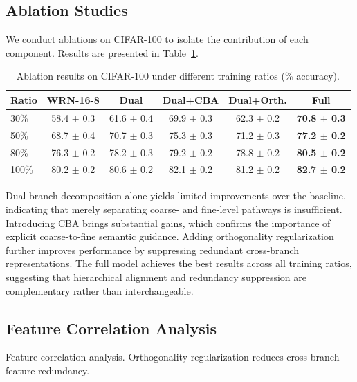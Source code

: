 \documentclass[pdflatex,sn-mathphys-num]{sn-jnl}
\theoremstyle{thmstyleone}%
\theoremstyle{thmstyletwo}%
\theoremstyle{thmstylethree}%
\begin{document}
\subsection{Ablation Studies}
We conduct ablations on CIFAR-100 to isolate the contribution of each component. Results are presented in Table~\ref{tab:ablation_all}.

\begin{table}[htbp]
    \centering
    \caption{Ablation results on CIFAR-100 under different training ratios (\% accuracy).}
    \label{tab:ablation_all}
    \setlength{\tabcolsep}{4pt}
    \renewcommand{\arraystretch}{1.1}
    \small
    \begin{tabular}{@{}lccccc@{}}
    \toprule
    \textbf{Ratio} & \textbf{WRN-16-8} & \textbf{Dual} & \textbf{Dual+CBA} & \textbf{Dual+Orth.} & \textbf{Full} \\
    \midrule
    30\%  & 58.4 $\pm$ 0.3 & 61.6 $\pm$ 0.4 & 69.9 $\pm$ 0.3 & 62.3 $\pm$ 0.2 & \textbf{70.8 $\pm$ 0.3} \\
    50\%  & 68.7 $\pm$ 0.4 & 70.7 $\pm$ 0.3 & 75.3 $\pm$ 0.3 & 71.2 $\pm$ 0.3 & \textbf{77.2 $\pm$ 0.2} \\
    80\%  & 76.3 $\pm$ 0.2 & 78.2 $\pm$ 0.3 & 79.2 $\pm$ 0.2 & 78.8 $\pm$ 0.2 & \textbf{80.5 $\pm$ 0.2} \\
    100\% & 80.2 $\pm$ 0.2 & 80.6 $\pm$ 0.2 & 82.1 $\pm$ 0.2 & 81.2 $\pm$ 0.2 & \textbf{82.7 $\pm$ 0.2} \\
    \bottomrule
    \end{tabular}
\end{table}

Dual-branch decomposition alone yields limited improvements over the baseline, indicating that merely separating coarse- and fine-level pathways is insufficient. 
Introducing CBA brings substantial gains, which confirms the importance of explicit coarse-to-fine semantic guidance. 
Adding orthogonality regularization further improves performance by suppressing redundant cross-branch representations. 
The full model achieves the best results across all training ratios, suggesting that hierarchical alignment and redundancy suppression are complementary rather than interchangeable.

\subsection{Feature Correlation Analysis}
Feature correlation analysis. Orthogonality regularization reduces cross-branch feature redundancy.
\end{document}
